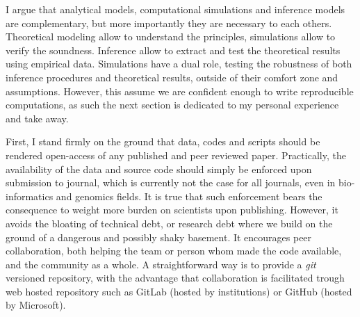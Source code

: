 I argue that analytical models, computational simulations and inference models are complementary, but more importantly they are necessary to each others.
Theoretical modeling allow to understand the principles, simulations allow to verify the soundness.
Inference allow to extract and test the theoretical results using empirical data.
Simulations have a dual role, testing the robustness of both inference procedures and theoretical results, outside of their comfort zone and assumptions.
However, this assume we are confident enough to write reproducible computations, as such the next section is dedicated to my personal experience and take away.

First, I stand firmly on the ground that data, codes and scripts should be rendered open-access of any published and peer reviewed paper.
Practically, the availability of the data and source code should simply be enforced upon submission to journal, which is currently not the case for all journals, even in bio-informatics and genomics fields.
It is true that such enforcement bears the consequence to weight more burden on scientists upon publishing.
However, it avoids the bloating of technical debt, or research debt where we build on the ground of a dangerous and possibly shaky basement.
It encourages peer collaboration, both helping the team or person whom made the code available, and the community as a whole.
A straightforward way is to provide a \textit{git} versioned repository, with the advantage that collaboration is facilitated trough web hosted repository such as GitLab (hosted by institutions) or GitHub (hosted by Microsoft).

